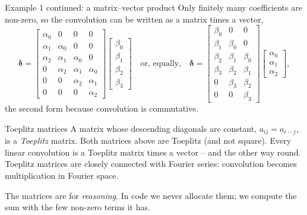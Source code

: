 \documentclass[10pt,aspectratio=169]{beamer}
\begin{document}
\begin{frame}{Example 1 continued: a matrix--vector product}
\small
Only finitely many coefficients are non-zero, so the convolution can be
written as a matrix times a vector,
\[
  \bm{\delta}=
  \begin{bmatrix}\alpha_0&0&0&0\\ \alpha_1&\alpha_0&0&0\\
  \alpha_2&\alpha_1&\alpha_0&0\\ 0&\alpha_2&\alpha_1&\alpha_0\\
  0&0&\alpha_2&\alpha_1\\ 0&0&0&\alpha_2\end{bmatrix}
  \begin{bmatrix}\beta_0\\ \beta_1\\ \beta_2\\ \beta_3\end{bmatrix}
  \quad\text{or, equally,}\quad
  \bm{\delta}=
  \begin{bmatrix}\beta_0&0&0\\ \beta_1&\beta_0&0\\ \beta_2&\beta_1&\beta_0\\
  \beta_3&\beta_2&\beta_1\\ 0&\beta_3&\beta_2\\ 0&0&\beta_3\end{bmatrix}
  \begin{bmatrix}\alpha_0\\ \alpha_1\\ \alpha_2\end{bmatrix},
\]
the second form because convolution is commutative.
\begin{block}{Toeplitz matrices}
A matrix whose descending diagonals are constant, $a_{ij}=a_{i-j}$, is a
\emph{Toeplitz} matrix.  Both matrices above are Toeplitz (and not
square).  Every linear convolution is a Toeplitz matrix times a vector --
and the other way round.  Toeplitz matrices are closely connected with
Fourier series: convolution becomes multiplication in Fourier space.
\end{block}
\scriptsize
The matrices are for \emph{reasoning}.  In code we never allocate them; we
compute the sum with the few non-zero terms it has.
\end{frame}
\end{document}
